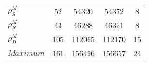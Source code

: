 \begin{center}
\begin{longtable}{lcccc}
$ {\rho^{M}_{S}}       $	 & 	                   52	 & 	                54320	 & 	                54372	 & 	                    8 \\ 
$ {\rho^{M}_{N}}       $	 & 	                   43	 & 	                46288	 & 	                46331	 & 	                    8 \\ 
$ {\rho^{M}_{D}}       $	 & 	                  105	 & 	               112065	 & 	               112170	 & 	                   15 \\ 
$Maximum               $	 & 	                  161	 & 	               156496	 & 	               156657	 & 	                   24 \\ 
\end{longtable}
 \end{center}
